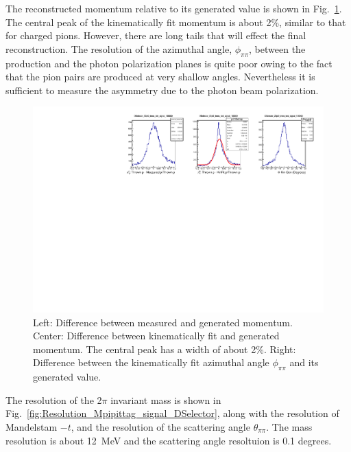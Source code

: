The reconstructed momentum relative to its generated value is shown in
Fig.~\ref{fig:DeltapDeltaPhi_signal_DSelector}. The central peak of the
kinematically fit momentum is about 2\%, similar to that for charged
pions. However, there are long tails that will effect the
final reconstruction. The resolution of the azimuthal angle,
$\phi_{\pi\pi}$, between the production and the photon polarization
planes is quite poor owing to the fact that the pion pairs are
produced at very shallow angles. Nevertheless it is sufficient to
measure the asymmetry due to the photon beam polarization.
\begin{figure}[tph]
\centering
\includegraphics[width=6in]{figures/DeltapDeltaPhi_signal_DSelector.pdf}
\caption{Left: Difference between measured and generated momentum. Center: Difference between kinematically fit and generated momentum. The central peak has a width of about 2\%. Right: Difference between the kinematically fit azimuthal angle $\phi_{\pi\pi}$ and its generated value.
\label{fig:DeltapDeltaPhi_signal_DSelector}}
\end{figure}
The resolution of the 2$\pi$ invariant mass is shown in Fig.~\ref{fig:Resolution_Mpipittag_signal_DSelector}, along with the resolution of Mandelstam $-t$, and the resolution of the scattering angle $\theta_{\pi\pi}$. The mass resolution is about 12~MeV and the scattering angle resoltuion is 0.1 degrees.
